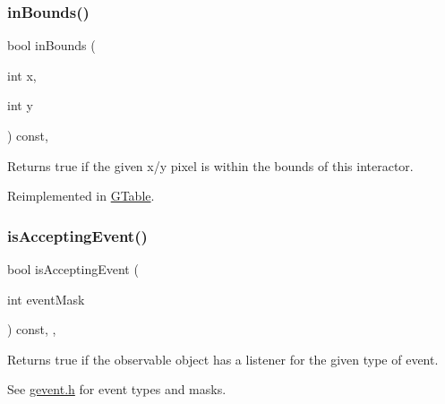\subsubsection{\texorpdfstring{in\+Bounds()}{inBounds()}\hspace{0.1cm}{\footnotesize\ttfamily [2/2]}}
{\footnotesize\ttfamily bool in\+Bounds (\begin{DoxyParamCaption}\item[{int}]{x,  }\item[{int}]{y }\end{DoxyParamCaption}) const\hspace{0.3cm}{\ttfamily [virtual]}, {\ttfamily [inherited]}}



Returns true if the given x/y pixel is within the bounds of this interactor. 



Reimplemented in \mbox{\hyperlink{classGTable_afa6b6241d2f7af75f2d1345f46acfc35}{G\+Table}}.

\mbox{\label{classGObservable_aeec1adc19aa0f33de62390686ee1382c}} 
\subsubsection{\texorpdfstring{is\+Accepting\+Event()}{isAcceptingEvent()}\hspace{0.1cm}{\footnotesize\ttfamily [1/3]}}
{\footnotesize\ttfamily bool is\+Accepting\+Event (\begin{DoxyParamCaption}\item[{int}]{event\+Mask }\end{DoxyParamCaption}) const\hspace{0.3cm}{\ttfamily [protected]}, {\ttfamily [virtual]}, {\ttfamily [inherited]}}



Returns true if the observable object has a listener for the given type of event. 

See \mbox{\hyperlink{gevent_8h_source}{gevent.\+h}} for event types and masks. \mbox{\label{classGObservable_aa31c73145a29dcb92848a92e0cfaea41}} 
